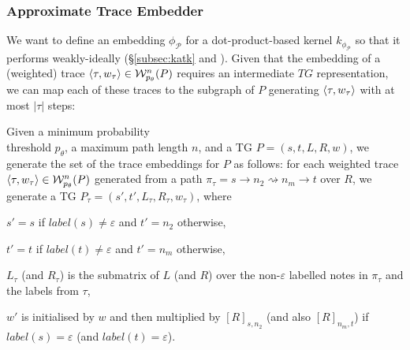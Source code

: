 \subsubsection{Approximate Trace Embedder}\label{subsec:ate}
{We want to define an embedding $\phi_\mathcal{P}$ for a dot-product-based kernel $k_{\phi_\mathcal{P}}$ so that it  performs weakly-ideally (\S\ref{subsec:katk} and \cite{Gartner03}). Given that the embedding of a (weighted) trace $\braket{\tau,w_\tau}\in\mathcal{W}_{p_\theta}^n(P)$ requires an intermediate $TG$ representation, we can map each of these traces to the subgraph of $P$ generating $\braket{\tau,w_\tau}$ with at most $|\tau|$ steps:}
	\begin{definition}
		Given a minimum probability\\ threshold $p_\theta$, a maximum path length $n$, and a TG $P=(s,t,L,R,w)$, we generate the set of the trace embeddings for $P$ as follows: for each weighted trace $\braket{\tau,w_\tau}\in\mathcal{W}_{p_\theta}^n(P)$ generated from a path $\pi_\tau=s\to n_2\rightsquigarrow n_m\to t$ over $R$, we generate a TG $P_\tau=(s',t',L_\tau,R_\tau,w_\tau)$, where \begin{alphalist}
			\item $s'=s$ if $\textit{label}(s)\neq \varepsilon$ and $t'=n_2$ otherwise,
			\item $t'=t$ if $\textit{label}(t)\neq \varepsilon$ and $t'=n_m$ otherwise,
			\item $L_\tau$ (and $R_\tau$) is the submatrix of $L$ (and $R$) over the non-$\varepsilon$ labelled notes in $\pi_\tau$ and the labels from $\tau$,
			\item $w'$ is initialised by $w$ and then multiplied by $[R]_{s,n_2}$ (and also $[R]_{n_m,t}$) if $\textit{label}(s)=\varepsilon$ (and  $\textit{label}(t)=\varepsilon$).
		\end{alphalist}
	\end{definition}

